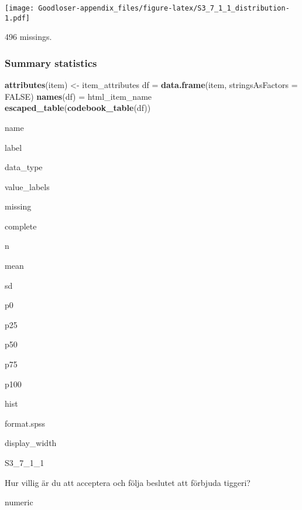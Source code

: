 \documentclass[]{book}
\newenvironment{Shaded}{\begin{snugshade}}{\end{snugshade}}
\newcommand{\KeywordTok}[1]{\textcolor[rgb]{0.13,0.29,0.53}{\textbf{#1}}}
\newcommand{\DataTypeTok}[1]{\textcolor[rgb]{0.13,0.29,0.53}{#1}}
\newcommand{\StringTok}[1]{\textcolor[rgb]{0.31,0.60,0.02}{#1}}
\newcommand{\OtherTok}[1]{\textcolor[rgb]{0.56,0.35,0.01}{#1}}
\newcommand{\OperatorTok}[1]{\textcolor[rgb]{0.81,0.36,0.00}{\textbf{#1}}}
\newcommand{\NormalTok}[1]{#1}
\begin{document}
\texttt{[image: Goodloser-appendix\_files/figure-latex/S3\_7\_1\_1\_distribution-1.pdf]}

\begin{Shaded}
\end{Shaded}

496 missings.

\subsubsection{Summary statistics}\label{S3_7_1_1_summary}

\begin{Shaded}
\begin{Highlighting}[]
\KeywordTok{attributes}\NormalTok{(item) <-}\StringTok{ }\NormalTok{item_attributes}
\NormalTok{df =}\StringTok{ }\KeywordTok{data.frame}\NormalTok{(item, }\DataTypeTok{stringsAsFactors =} \OtherTok{FALSE}\NormalTok{)}
\KeywordTok{names}\NormalTok{(df) =}\StringTok{ }\NormalTok{html_item_name}
\KeywordTok{escaped_table}\NormalTok{(}\KeywordTok{codebook_table}\NormalTok{(df))}
\end{Highlighting}
\end{Shaded}

name

label

data\_type

value\_labels

missing

complete

n

mean

sd

p0

p25

p50

p75

p100

hist

format.spss

display\_width

S3\_7\_1\_1

Hur villig är du att acceptera och följa beslutet att förbjuda tiggeri?

numeric
\end{document}

